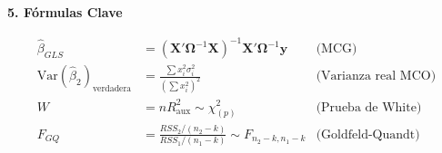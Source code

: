 \documentclass[12pt,a4paper]{report}
\theoremstyle{definition}
\theoremstyle{remark}
\newcommand{\Var}{\mathrm{Var}}
\newcommand{\betahat}{\hat{\beta}}
\begin{document}
\begin{tcolorbox}[enhanced, breakable, colback=azuloscuro!5, colframe=azuloscuro,
                  title={\Large\bfseries Síntesis: Heteroscedasticidad},
                  fonttitle=\color{white}]
  \vspace{0.5cm}
  \textbf{\large 5. Fórmulas Clave}

  \begin{align*}
    \betahat_{GLS} &= (\mathbf{X}'\boldsymbol{\Omega}^{-1}\mathbf{X})^{-1}\mathbf{X}'\boldsymbol{\Omega}^{-1}\mathbf{y} &\text{(MCG)}\\
    \Var(\betahat_2)_{\text{verdadera}} &= \frac{\sum x_i^2\sigma_i^2}{(\sum x_i^2)^2} &\text{(Varianza real MCO)}\\
    W &= nR^2_{\text{aux}} \sim \chi^2_{(p)} &\text{(Prueba de White)}\\
    F_{GQ} &= \frac{RSS_2/(n_2-k)}{RSS_1/(n_1-k)} \sim F_{n_2-k,n_1-k} &\text{(Goldfeld-Quandt)}
  \end{align*}
\end{tcolorbox}
\end{document}
